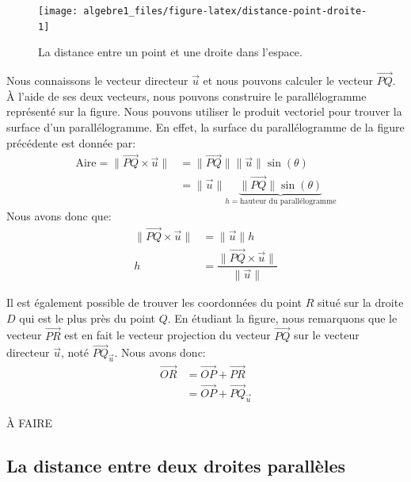 \documentclass[]{book}
\theoremstyle{definition}
\theoremstyle{definition}
\theoremstyle{definition}
\theoremstyle{remark}
\let\BeginKnitrBlock\begin \let\EndKnitrBlock\end
\begin{document}
\begin{figure}

{\centering \texttt{[image: algebre1\_files/figure-latex/distance-point-droite-1]} 

}

\caption{La distance entre un point et une droite dans l'espace.}\label{fig:distance-point-droite}
\end{figure}

Nous connaissons le vecteur directeur \(\vec u\) et nous pouvons calculer le vecteur \(\overrightarrow{PQ}\). À l'aide de ses deux vecteurs, nous pouvons construire le parallélogramme représenté sur la figure. Nous pouvons utiliser le produit vectoriel pour trouver la surface d'un parallélogramme. En effet, la surface du parallélogramme de la figure précédente est donnée par:
\begin{align*}
\text{Aire} = \lVert\overrightarrow{PQ} \times \vec u\rVert &= \lVert\overrightarrow{PQ}\rVert\lVert\vec u\rVert \sin(\theta) \\
&= \lVert\vec u\rVert\underbrace{\lVert\overrightarrow{PQ}\rVert\sin(\theta)}_{h=\text{hauteur du parallélogramme}}
\end{align*}
Nous avons donc que:
\begin{align*}
\lVert\overrightarrow{PQ} \times \vec u\rVert &= \lVert\vec u\rVert h \\
h &= \dfrac{\lVert\overrightarrow{PQ} \times \vec u\rVert}{\lVert\vec u\rVert}
\end{align*}

Il est également possible de trouver les coordonnées du point \(R\) situé sur la droite \(D\) qui est le plus près du point \(Q\). En étudiant la figure, nous remarquons que le vecteur \(\overrightarrow{PR}\) est en fait le vecteur projection du vecteur \(\overrightarrow{PQ}\) sur le vecteur directeur \(\vec u\), noté \(\overrightarrow{PQ}_{\vec u}\). Nous avons donc:
\begin{align*}
\overrightarrow{OR} &= \overrightarrow{OP}+\overrightarrow{PR} \\
&= \overrightarrow{OP}+\overrightarrow{PQ}_{\vec u}
\end{align*}

\BeginKnitrBlock{example}
\protect\hypertarget{exm:unnamed-chunk-212}{}{\label{exm:unnamed-chunk-212} }À FAIRE
\EndKnitrBlock{example}

\hypertarget{la-distance-entre-deux-droites-paralluxe8les}{%
\subsection{La distance entre deux droites parallèles}\label{la-distance-entre-deux-droites-paralluxe8les}}
\end{document}
